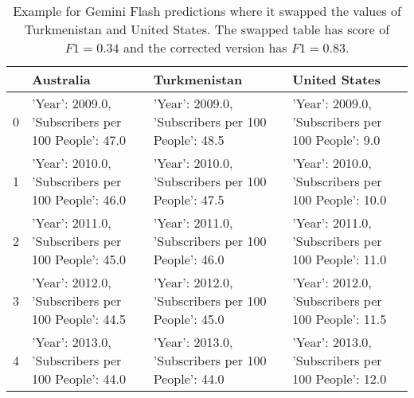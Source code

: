 \begin{table}
\begin{tabular}{llll}
\toprule
 & Australia & Turkmenistan & United States \\
\midrule
0 & {'Year': 2009.0, 'Subscribers per 100 People': 47.0} & {'Year': 2009.0, 'Subscribers per 100 People': 48.5} & {'Year': 2009.0, 'Subscribers per 100 People': 9.0} \\
1 & {'Year': 2010.0, 'Subscribers per 100 People': 46.0} & {'Year': 2010.0, 'Subscribers per 100 People': 47.5} & {'Year': 2010.0, 'Subscribers per 100 People': 10.0} \\
2 & {'Year': 2011.0, 'Subscribers per 100 People': 45.0} & {'Year': 2011.0, 'Subscribers per 100 People': 46.0} & {'Year': 2011.0, 'Subscribers per 100 People': 11.0} \\
3 & {'Year': 2012.0, 'Subscribers per 100 People': 44.5} & {'Year': 2012.0, 'Subscribers per 100 People': 45.0} & {'Year': 2012.0, 'Subscribers per 100 People': 11.5} \\
4 & {'Year': 2013.0, 'Subscribers per 100 People': 44.0} & {'Year': 2013.0, 'Subscribers per 100 People': 44.0} & {'Year': 2013.0, 'Subscribers per 100 People': 12.0} \\
\bottomrule
\end{tabular}
\caption{Example for Gemini Flash predictions where it swapped the values of Turkmenistan and United States. The swapped table has score of $F1=0.34$ and the corrected version has $F1=0.83$.}
\label{tab:gemini-plotqa-line-18806}
\end{table}
